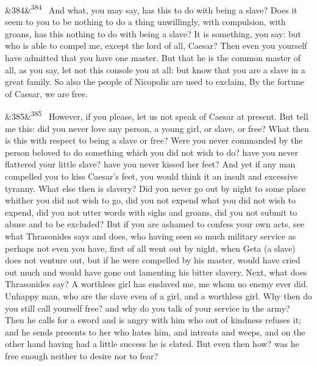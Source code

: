 \documentclass[12pt]{article}
\newcommand{\para}[1][]{\par\noindent\ifx&#1&\else\textsuperscript{\footnotesize #1}~\fi}
\begin{document}
\para[384] And what, you may say, has this to do with being a slave? Does it seem to you to be nothing to do a thing unwillingly, with compulsion, with groans, has this nothing to do with being a slave? It is something, you say: but who is able to compel me, except the lord of all, Caesar? Then even you yourself have admitted that you have one master. But that he is the common master of all, as you say, let not this console you at all: but know that you are a slave in a great family. So also the people of Nicopolis are used to exclaim, By the fortune of Caesar, we are free.

\para[385] However, if you please, let us not speak of Caesar at present. But tell me this: did you never love any person, a young girl, or slave, or free? What then is this with respect to being a slave or free? Were you never commanded by the person beloved to do something which you did not wish to do? have you never flattered your little slave? have you never kissed her feet? And yet if any man compelled you to kiss Caesar's feet, you would think it an insult and excessive tyranny. What else then is slavery? Did you never go out by night to some place whither you did not wish to go, did you not expend what you did not wish to expend, did you not utter words with sighs and groans, did you not submit to abuse and to be excluded? But if you are ashamed to confess your own acts, see what Thrasonides says and does, who having seen so much military service as perhaps not even you have, first of all went out by night, when Geta (a slave) does not venture out, but if he were compelled by his master, would have cried out much and would have gone out lamenting his bitter slavery. Next, what does Thrasonides say? A worthless girl has enslaved me, me whom no enemy ever did. Unhappy man, who are the slave even of a girl, and a worthless girl. Why then do you still call yourself free? and why do you talk of your service in the army? Then he calls for a sword and is angry with him who out of kindness refuses it; and he sends presents to her who hates him, and intreats and weeps, and on the other hand having had a little success he is elated. But even then how? was he free enough neither to desire nor to fear?
\end{document}
